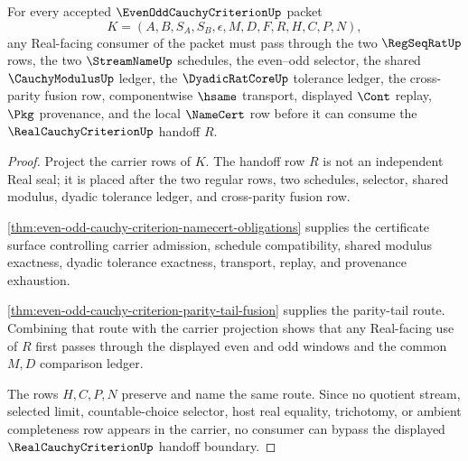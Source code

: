 \begin{theorem}
\label{thm:even-odd-cauchy-criterion-real-seal-route}
For every accepted $\EvenOddCauchyCriterionUp$ packet
$$
K=(A,B,S_A,S_B,\epsilon,M,D,F,R,H,C,P,N),
$$
any Real-facing consumer of the packet must pass through the two $\RegSeqRatUp$ rows, the two $\StreamNameUp$ schedules, the even--odd selector, the shared $\CauchyModulusUp$ ledger, the $\DyadicRatCoreUp$ tolerance ledger, the cross-parity fusion row, componentwise $\hsame$ transport, displayed $\Cont$ replay, $\Pkg$ provenance, and the local $\NameCert$ row before it can consume the $\RealCauchyCriterionUp$ handoff $R$.
\end{theorem}
\begin{proof}
Project the carrier rows of $K$. The handoff row $R$ is not an independent Real seal; it is placed after the two regular rows, two schedules, selector, shared modulus, dyadic tolerance ledger, and cross-parity fusion row.

\autoref{thm:even-odd-cauchy-criterion-namecert-obligations} supplies the certificate surface controlling carrier admission, schedule compatibility, shared modulus exactness, dyadic tolerance exactness, transport, replay, and provenance exhaustion.

\autoref{thm:even-odd-cauchy-criterion-parity-tail-fusion} supplies the parity-tail route. Combining that route with the carrier projection shows that any Real-facing use of $R$ first passes through the displayed even and odd windows and the common $M,D$ comparison ledger.

The rows $H,C,P,N$ preserve and name the same route. Since no quotient stream, selected limit, countable-choice selector, host real equality, trichotomy, or ambient completeness row appears in the carrier, no consumer can bypass the displayed $\RealCauchyCriterionUp$ handoff boundary.
\end{proof}

